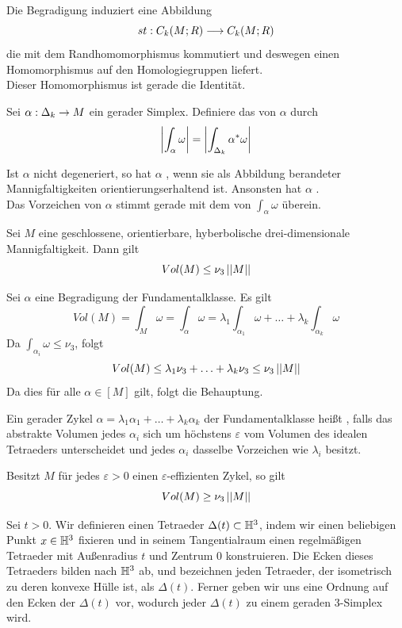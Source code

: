 \documentclass{book}
\renewcommand{\epsilon}{\varepsilon}
\begin{document}
\Lem{}
Die Begradigung induziert eine Abbildung
\[ st : C_k(M;R) \overset{}{\longrightarrow} C_k(M;R) \]
die mit dem Randhomomorphismus kommutiert und deswegen einen Homomorphismus auf den Homologiegruppen liefert.\\
Dieser Homomorphismus ist gerade die Identität.

\Def{}
Sei $\alpha : \Delta_k \overset{}{\rightarrow} M$ ein gerader Simplex. Definiere das  von $\alpha$ durch
\[ \left|\int_{\alpha} \omega\right| =\left|\int_{\Delta_k} \alpha^*\omega  \right| \]

\Def{}
Ist $\alpha$ nicht degeneriert, so hat $\alpha$ , wenn sie als Abbildung berandeter Mannigfaltigkeiten orientierungserhaltend ist. Ansonsten hat $\alpha$ .\\
Das Vorzeichen von $\alpha$ stimmt gerade mit dem von $\int_{\alpha} \omega$ überein.

\Prop{}
Sei $M$ eine geschlossene, orientierbare, hyberbolische drei-dimensionale Mannigfaltigkeit. Dann gilt
\[ Vol({M}) \leq \nu_3 \left|\left|M\right|\right| \]
\begin{Beweis}{}
	Sei $\alpha$ eine Begradigung der Fundamentalklasse. Es gilt
	\[ Vol(M) = \int_M \omega = \int_{\alpha} \omega = \lambda_1 \int_{\alpha_1} \omega + \ldots +\lambda_k \int_{\alpha_k} \omega \]
	Da $\int_{\alpha_i} \omega\leq \nu_3$, folgt
	\[ Vol(M) \leq \lambda_1 \nu_3 +\ldots + \lambda_k \nu_3 \leq \nu_3 \left|\left|M\right|\right| \]
	Da dies für alle $\alpha \in [M]$ gilt, folgt die Behauptung.
\end{Beweis}

\Def{}
Ein gerader {Zykel} $\alpha = \lambda_1 \alpha_1 + \ldots + \lambda_k \alpha_k$ der Fundamentalklasse heißt \df{$\epsilon$-effizient}, falls das abstrakte Volumen jedes $\alpha_i$ sich um höchstens $\epsilon$ vom Volumen des idealen Tetraeders unterscheidet und jedes $\alpha_i$ dasselbe Vorzeichen wie $\lambda_i$ besitzt.

\Lem{}
Besitzt $M$ für jedes $\epsilon > 0$ einen $\epsilon$-effizienten Zykel, so gilt
\[ Vol({M}) \geq \nu_3 \left|\left|M\right|\right| \]

\Def{}
Sei $t > 0$. Wir definieren einen Tetraeder $\Delta(t) \subset \mathbb{H}^3$, indem wir einen beliebigen Punkt $x \in \mathbb{H}^3$ fixieren und in seinem Tangentialraum einen regelmäßigen Tetraeder mit Außenradius $t$ und Zentrum $0$ konstruieren. Die Ecken dieses Tetraeders bilden nach $\mathbb{H}^3$ ab, und bezeichnen jeden Tetraeder, der isometrisch zu deren konvexe Hülle ist, als $\Delta(t)$. Ferner geben wir uns eine Ordnung auf den Ecken der $\Delta(t)$ vor, wodurch jeder $\Delta(t)$ zu einem geraden 3-Simplex wird.
\end{document}
